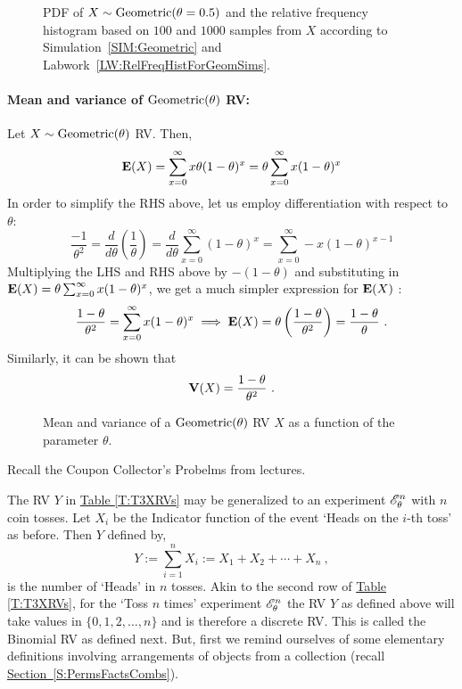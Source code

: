 \begin{figure}[htpb]
\caption{PDF of $X \sim \mbox{{\rm Geometric}}(\theta=0.5)$ and the relative frequency histogram based on $100$ and $1000$ samples from $X$ according to Simulation~\ref{SIM:Geometric} and Labwork~\ref{LW:RelFreqHistForGeomSims}.\label{F:PlotPdfSimHistGeomthetaHalf}}
\centering   {}
\end{figure}

\paragraph{Mean and variance of $\mbox{{\rm Geometric}}(\theta)$ RV:}
Let $X \sim \mbox{{\rm Geometric}}(\theta)$ RV.  Then,
\[
\mathbf{E}(X) = \sum_{x=0}^{\infty} x \theta(1-\theta)^x =  \theta \sum_{x=0}^{\infty} x (1-\theta)^x
\]
In order to simplify the RHS above, let us employ differentiation with respect to $\theta$:
\[
\frac{-1}{\theta^2}= \frac{d}{d\theta} \left( \frac{1}{\theta} \right)= \frac{d}{d\theta} \sum_{x=0}^{\infty} (1-\theta)^x  =  \sum_{x=0}^{\infty} -x (1-\theta)^{x-1}
\]
Multiplying the LHS and RHS above by $-(1-\theta)$ and substituting in $\mathbf{E}(X)=  \theta \sum_{x=0}^{\infty} x (1-\theta)^x$, we get a much simpler expression for $\mathbf{E}(X)$ :
\[
\frac{1-\theta}{\theta^2}= \sum_{x=0}^{\infty} x (1-\theta)^{x} \implies \mathbf{E}(X) = \theta \left( \frac{1-\theta}{\theta^2} \right) = \frac{1-\theta}{\theta} \ .
\]
Similarly, it can be shown that
\[
\mathbf{V}(X) = \frac{1-\theta}{\theta^2} \ .
\]

\begin{figure}[htpb]
\caption{Mean and variance of a $\mbox{{\rm Geometric}}(\theta)$ RV $X$ as a function of the parameter $\theta$.\label{F:MeanVarGeom}}
\centering   {}
\end{figure}

\begin{example}
Recall the Coupon Collector's Probelms from lectures.%
\vspace{5cm}
~ 
\end{example}

The RV $Y$ in \hyperref[T:T3XRVs]{Table \ref*{T:T3XRVs}} may be generalized to an experiment $\mathscr{E}_{\theta}^{n}$ with $n$ coin tosses.  
Let $X_i$ be the Indicator function of the event `Heads on the $i$-th toss' as before.  Then $Y$ defined by,
 \[
 Y := \sum_{i=1}^n X_i := X_1 + X_2 + \cdots + X_n  \ ,
 \]
is the number of `Heads' in $n$ tosses.  
Akin to the second row of \hyperref[T:T3XRVs]{Table \ref*{T:T3XRVs}}, for the `Toss $n$ times' experiment $\mathscr{E}_{\theta}^{n}$ the
RV $Y$ as defined above will take values in $\{0,1,2,\ldots,n\}$ and is therefore a discrete RV.  This is called the Binomial RV as defined next.  
But, first we remind ourselves of some elementary definitions involving arrangements of objects from a collection (recall \hyperref[S:PermsFactsCombs]{Section~\ref*{S:PermsFactsCombs}}).


